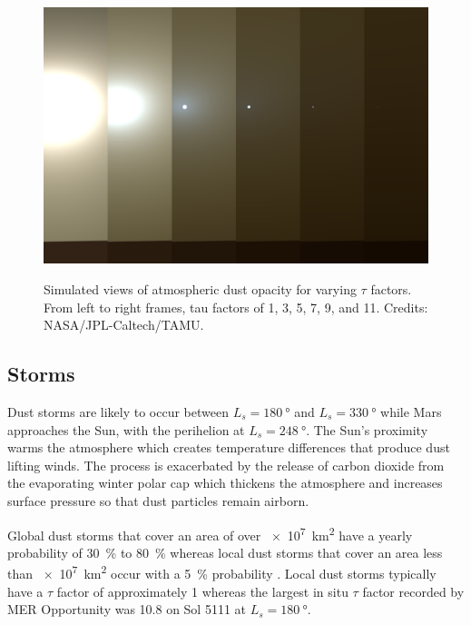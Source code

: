 \begin{figure}[H]
  \centering
  \hypersetup{linkcolor=captionTextColor}
  \includegraphics[width=0.8\linewidth]{sections/martian-environment/images/tau-factors.png}\\
  \caption[Simulated views of atmospheric dust opacity for varying $\tau$ factors]
          {Simulated views of atmospheric dust opacity for varying $\tau$ factors. From left to right frames, tau factors of 1, 3, 5, 7, 9, and 11. Credits: NASA/JPL-Caltech/TAMU.}
  \label{fig:image:tau-factors}
\end{figure}

\subsection{Storms}
\label{sec:MartianEnvironment:Dust:Storms}

Dust storms are likely to occur between $L_{s} = \SI{180}{\degree}$ and $L_{s} = \SI{330}{\degree}$ while Mars approaches the Sun, with the perihelion at $L_{s} = \SI{248}{\degree}$. The Sun's proximity warms the atmosphere which creates temperature differences that produce dust lifting winds. The process is exacerbated by the release of carbon dioxide from the evaporating winter polar cap which thickens the atmosphere and increases surface pressure so that dust particles remain airborn.


Global dust storms that cover an area of over \SI{e7}{\kilo\meter\squared} have a yearly probability of \SI{30}{\percent} to \SI{80}{\percent} whereas local dust storms that cover an area less than \SI{e7}{\kilo\meter\squared} occur with a \SI{5}{\percent} probability . Local dust storms typically have a $\tau$ factor of approximately 1  whereas the largest in situ $\tau$ factor recorded by MER Opportunity was 10.8 on Sol 5111 at $L_{s} = \SI{180}{\degree}$.


